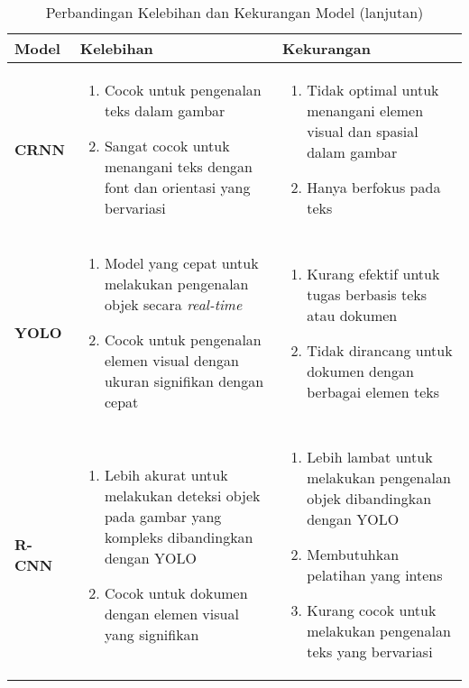 \begin{table}[h!]
\ContinuedFloat %
\caption{Perbandingan Kelebihan dan Kekurangan Model (lanjutan)}
\begin{tabularx}{\linewidth}{|p{2cm}|X|X|}
\hline
\textbf{Model} & \textbf{Kelebihan} & \textbf{Kekurangan} \\
\hline

\textbf{CRNN} &
\begin{enumerate}
    \item Cocok untuk pengenalan teks dalam gambar
    \item Sangat cocok untuk menangani teks dengan font dan orientasi yang bervariasi
\end{enumerate}
&
\begin{enumerate}
    \item Tidak optimal untuk menangani elemen visual dan spasial dalam gambar
    \item Hanya berfokus pada teks
\end{enumerate}
\\ \hline

\textbf{YOLO} &
\begin{enumerate}
    \item Model yang cepat untuk melakukan pengenalan objek secara \textit{real-time}
    \item Cocok untuk pengenalan elemen visual dengan ukuran signifikan dengan cepat
\end{enumerate}
&
\begin{enumerate}
    \item Kurang efektif untuk tugas berbasis teks atau dokumen
    \item Tidak dirancang untuk dokumen dengan berbagai elemen teks
\end{enumerate}
\\ \hline

\textbf{R-CNN} &
\begin{enumerate}
    \item Lebih akurat untuk melakukan deteksi objek pada gambar yang kompleks dibandingkan dengan \newline YOLO
    \item Cocok untuk dokumen dengan elemen visual yang signifikan
\end{enumerate}
&
\begin{enumerate}
    \item Lebih lambat untuk melakukan pengenalan objek dibandingkan dengan \newline YOLO
    \item Membutuhkan pelatihan yang intens
    \item Kurang cocok untuk melakukan pengenalan teks yang bervariasi
\end{enumerate}
\\ \hline
\end{tabularx}
\end{table}

